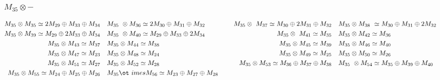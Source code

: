 \subsubsection{$M_35\otimes -$}
\begin{align*}
M_{35} \otimes M_{35} \simeq 2 M_{29} \oplus M_{33} \oplus M_{34} &&& M_{35} \
\otimes M_{36} \simeq 2 M_{30} \oplus M_{31} \oplus M_{32} &&& M_{35} \otimes \
M_{37} \simeq M_{30} \oplus 2 M_{31} \oplus M_{32} &&& M_{35} \otimes M_{38} \
\simeq M_{30} \oplus M_{31} \oplus 2 M_{32}\\
M_{35} \otimes M_{39} \simeq M_{29} \oplus 2 M_{33} \oplus M_{34} &&& M_{35} \
\otimes M_{40} \simeq M_{29} \oplus M_{33} \oplus 2 M_{34} &&& M_{35} \otimes \
M_{41} \simeq M_{35} &&& M_{35} \otimes M_{42} \simeq M_{36}\\
M_{35} \otimes M_{43} \simeq M_{37} &&& M_{35} \otimes M_{44} \simeq M_{38} &&\
& M_{35} \otimes M_{45} \simeq M_{39} &&& M_{35} \otimes M_{46} \simeq M_{40}\
\\
M_{35} \otimes M_{47} \simeq M_{23} &&& M_{35} \otimes M_{48} \simeq M_{24} &&\
& M_{35} \otimes M_{49} \simeq M_{25} &&& M_{35} \otimes M_{50} \simeq M_{26}\
\\
M_{35} \otimes M_{51} \simeq M_{27} &&& M_{35} \otimes M_{52} \simeq M_{28} &&\
& M_{35} \otimes M_{53} \simeq M_{36} \oplus M_{37} \oplus M_{38} &&& M_{35} \
\otimes M_{54} \simeq M_{35} \oplus M_{39} \oplus M_{40}\\
M_{35} \otimes M_{55} \simeq M_{24} \oplus M_{25} \oplus M_{26} &&& M_{35} \ot\
imes M_{56} \simeq M_{23} \oplus M_{27} \oplus M_{28}\\
\end{align*}


